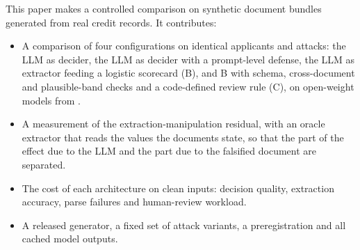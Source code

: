 This paper makes a controlled comparison on synthetic document bundles generated from \nCleanRows{} real credit records. It contributes:
\begin{itemize}
  \item A comparison of four configurations on identical applicants and attacks: the LLM as decider, the LLM as decider with a prompt-level defense, the LLM as extractor feeding a logistic scorecard (B), and B with schema, cross-document and plausible-band checks and a code-defined review rule (C), on \nModels{} open-weight models from \modelRange{}.
  \item A measurement of the extraction-manipulation residual, with an oracle extractor that reads the values the documents state, so that the part of the effect due to the LLM and the part due to the falsified document are separated.
  \item The cost of each architecture on clean inputs: decision quality, extraction accuracy, parse failures and human-review workload.
  \item A released generator, a fixed set of \nAttacks{} attack variants, a preregistration and all cached model outputs.
\end{itemize}
